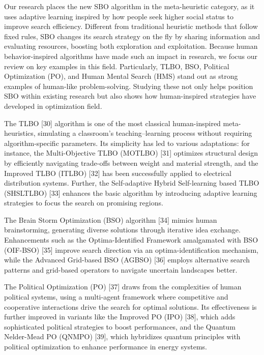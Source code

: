 \documentclass{article} %
\begin{document}
Our research places the new SBO algorithm in the meta-heuristic category, as it uses adaptive learning inspired by how people seek higher social status to improve search efficiency. Different from traditional heuristic methods that follow fixed rules, SBO changes its search strategy on the fly by sharing information and evaluating resources, boosting both exploration and exploitation. Because human behavior-inspired algorithms have made such an impact in research, we focus our review on key examples in this field. Particularly, TLBO, BSO, Political Optimization (PO), and Human Mental Search (HMS) stand out as strong examples of human-like problem-solving. Studying these not only helps position SBO within existing research but also shows how human-inspired strategies have developed in optimization field.

The TLBO [30] algorithm is one of the most classical human-inspired meta-heuristics, simulating a classroom's teaching--learning process without requiring algorithm-specific parameters. Its simplicity has led to various adaptations: for instance, the Multi-Objective TLBO (MOTLBO) [31] optimizes structural design by efficiently navigating trade-offs between weight and material strength, and the Improved TLBO (ITLBO) [32] has been successfully applied to electrical distribution systems. Further, the Self-adaptive Hybrid Self-learning based TLBO (SHSLTLBO) [33] enhances the basic algorithm by introducing adaptive learning strategies to focus the search on promising regions.

The Brain Storm Optimization (BSO) algorithm [34] mimics human brainstorming, generating diverse solutions through iterative idea exchange. Enhancements such as the Optima-Identified Framework amalgamated with BSO (OIF-BSO) [35] improve search direction via an optima-identification mechanism, while the Advanced Grid-based BSO (AGBSO) [36] employs alternative search patterns and grid-based operators to navigate uncertain landscapes better.

The Political Optimization (PO) [37] draws from the complexities of human political systems, using a multi-agent framework where competitive and cooperative interactions drive the search for optimal solutions. Its effectiveness is further improved in variants like the Improved PO (IPO) [38], which adds sophisticated political strategies to boost performances, and the Quantum Nelder-Mead PO (QNMPO) [39], which hybridizes quantum principles with political optimization to enhance performance in energy systems.
\end{document}
